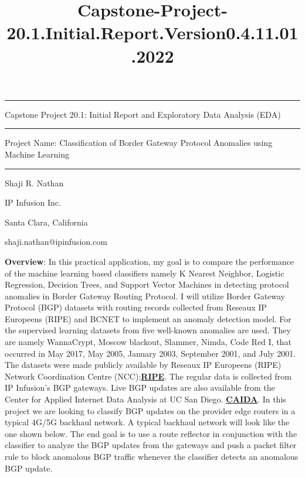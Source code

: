 \documentclass[11pt]{article}
\title{Capstone-Project-20.1.Initial.Report.Version0.4.11.01.2022}
\begin{document}
    
    
    \maketitle
    
    

    
    \begin{center}\rule{0.5\linewidth}{\linethickness}\end{center}

Capstone Project 20.1: Initial Report and Exploratory Data Analysis
(EDA)

\begin{center}\rule{0.5\linewidth}{\linethickness}\end{center}

Project Name: Classification of Border Gateway Protocol Anomalies using
Machine Learning

\begin{center}\rule{0.5\linewidth}{\linethickness}\end{center}

Shaji R. Nathan

IP Infusion Inc.

Santa Clara, California

shaji.nathan@ipinfusion.com

    \textbf{Overview}: In this practical application, my goal is to compare
the performance of the machine learning based classifiers namely K
Nearest Neighbor, Logistic Regression, Decision Trees, and Support
Vector Machines in detecting protocol anomalies in Border Gateway
Routing Protocol. I will utilize Border Gateway Protocol (BGP) datasets
with routing records collected from Reseaux IP Europeens (RIPE) and
BCNET to implement an anomaly detection model. For the supervised
learning datasets from five well-known anomalies are used. They are
namely WannaCrypt, Moscow blackout, Slammer, Nimda, Code Red I, that
occurred in May 2017, May 2005, January 2003, September 2001, and July
2001. The datasets were made publicly available by Reseaux IP Europeens
(RIPE) Network Coordination Centre
(NCC):\textbf{\href{http://www.ensc.sfu.ca/~ljilja/cnl/projects/BGP_datasets/BGP_RIPE_datasets_for_anomaly_detection_csv_revised_19022021.zip}{RIPE}}.
The regular data is collected from IP Infusion's BGP gateways. Live BGP
updates are also available from the Center for Applied Internet Data
Analysis at UC San Diego.
\textbf{\href{https://bgpstream.caida.org/data}{CAIDA}}. In this project
we are looking to classify BGP updates on the provider edge routers in a
typical 4G/5G backhaul network. A typical backhaul network will look
like the one shown below. The end goal is to use a route reflector in
conjunction with the classifier to analyze the BGP updates from the
gateways and push a packet filter rule to block anomalous BGP traffic
whenever the classifier detects an anomalous BGP update.
\end{document}
